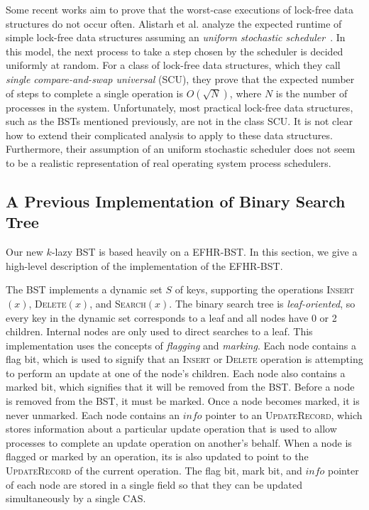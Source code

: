 \documentclass[letterpaper]{article}
\newcommand{\info}{\mathit{info}}
\begin{document}
Some recent works aim to prove that the worst-case executions of lock-free data structures do not occur often. Alistarh et al. analyze the expected runtime of simple lock-free data structures assuming an \textit{uniform stochastic scheduler}~\cite{AlistarhCS14}. In this model, the next process to take a step chosen by the scheduler is decided uniformly at random. For a class of lock-free data structures, which they call \textit{single compare-and-swap universal} (SCU), they prove that the expected number of steps to complete a single operation is $O(\sqrt{N})$, where $N$ is the number of processes in the system. Unfortunately, most practical lock-free data structures, such as the BSTs mentioned previously, are not in the class SCU. It is not clear how to extend their complicated analysis to apply to these data structures. Furthermore, their assumption of an uniform stochastic scheduler does not seem to be a realistic representation of real operating system process schedulers.

\subsection{A Previous Implementation of Binary Search Tree}\label{section_bst_EFHR}
Our new $k$-lazy BST is based heavily on a EFHR-BST. In this section, we give a high-level description of the implementation of the EFHR-BST. 

The BST implements a dynamic set $S$ of keys, supporting the operations \textsc{Insert}$(x)$, \textsc{Delete}$(x)$, and \textsc{Search}$(x)$. The binary search tree is \textit{leaf-oriented}, so every key in the dynamic set corresponds to a leaf and all nodes have 0 or 2 children. Internal nodes are only used to direct searches to a leaf. This implementation uses the concepts of \textit{flagging} and \textit{marking}. Each node contains a flag bit, which is used to signify that an \textsc{Insert} or \textsc{Delete} operation is attempting to perform an update at one of the node's children. Each node also contains a marked bit, which signifies that it will be removed from the BST. Before a node is removed from the BST, it must be marked. Once a node becomes marked, it is never unmarked. Each node contains an $\info$ pointer to an \textsc{UpdateRecord}, which stores information about a particular update operation that is used to allow processes to complete an update operation on another's behalf. When a node is flagged or marked by an operation, its is also updated to point to the \textsc{UpdateRecord} of the current operation. The flag bit, mark bit, and $\info$ pointer of each node are stored in a single field so that they can be updated simultaneously by a single CAS.
\end{document}
